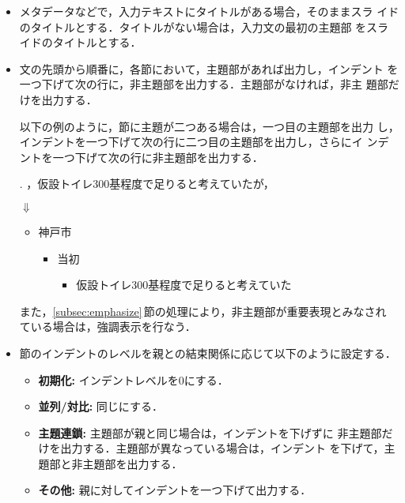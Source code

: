 \begin{itemize}
 \item メタデータなどで，入力テキストにタイトルがある場合，そのままスラ
       イドのタイトルとする．タイトルがない場合は，入力文の最初の主題部
       をスライドのタイトルとする．

\item 文の先頭から順番に，各節において，主題部があれば出力し，インデント
       を一つ下げて次の行に，非主題部を出力する．主題部がなければ，非主
       題部だけを出力する．

       以下の例のように，節に主題が二つある場合は，一つ目の主題部を出力
       し，インデントを一つ下げて次の行に二つ目の主題部を出力し，さらにイ
       ンデントを一つ下げて次の行に非主題部を出力する．

\ex. ，仮設トイレ300基程度で足りると考えていたが， 
\vspace{-3mm}
\begin{center}$\Downarrow$\end{center}
\vspace{-3mm}
\begin{minipage}[t]{0.75\hsize}
\begin{itemize}
 \item 神戸市
   \begin{itemize}
     \item 当初
    \begin{itemize}
      \item 仮設トイレ300基程度で足りると考えていた
    \end{itemize}
\end{itemize}
\end{itemize}
\end{minipage}

\vspace{4mm}
また，\ref{subsec:emphasize}\,節の処理により，非主題部が重要表現とみなされ
       ている場合は，強調表示を行なう．
       
\item 節のインデントのレベルを親との結束関係に応じて以下のように設定する．

  \begin{itemize}
   \item \textbf{初期化:} インデントレベルを0にする．

   \item \textbf{並列/対比:} 同じにする．

   \item \textbf{主題連鎖:} 主題部が親と同じ場合は，インデントを下げずに
	 非主題部だけを出力する．主題部が異なっている場合は，インデント
	 を下げて，主題部と非主題部を出力する．

 \item \textbf{その他:} 親に対してインデントを一つ下げて出力する．

 \end{itemize}
\end{itemize}

